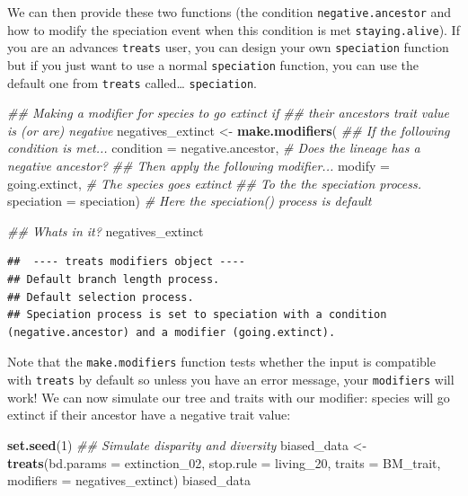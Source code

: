 \documentclass[
]{book}
\newenvironment{Shaded}{\begin{snugshade}}{\end{snugshade}}
\newcommand{\CommentTok}[1]{\textcolor[rgb]{0.56,0.35,0.01}{\textit{#1}}}
\newcommand{\DataTypeTok}[1]{\textcolor[rgb]{0.13,0.29,0.53}{#1}}
\newcommand{\DecValTok}[1]{\textcolor[rgb]{0.00,0.00,0.81}{#1}}
\newcommand{\KeywordTok}[1]{\textcolor[rgb]{0.13,0.29,0.53}{\textbf{#1}}}
\newcommand{\NormalTok}[1]{#1}
\newcommand{\StringTok}[1]{\textcolor[rgb]{0.31,0.60,0.02}{#1}}
\begin{document}
We can then provide these two functions (the condition \texttt{negative.ancestor} and how to modify the speciation event when this condition is met \texttt{staying.alive}).
If you are an advances \texttt{treats} user, you can design your own \texttt{speciation} function but if you just want to use a normal \texttt{speciation} function, you can use the default one from \texttt{treats} called\ldots{} \texttt{speciation}.

\begin{Shaded}
\begin{Highlighting}[]
\CommentTok{\#\# Making a modifier for species to go extinct if}
\CommentTok{\#\# their ancestor\textquotesingle{}s trait value is (or are) negative}
\NormalTok{negatives\_extinct \textless{}{-}}\StringTok{ }\KeywordTok{make.modifiers}\NormalTok{(}
            \CommentTok{\#\# If the following condition is met...}
            \DataTypeTok{condition =}\NormalTok{ negative.ancestor, }\CommentTok{\# Does the lineage has a negative ancestor?}
            \CommentTok{\#\# Then apply the following modifier...}
            \DataTypeTok{modify =}\NormalTok{ going.extinct, }\CommentTok{\# The species goes extinct}
            \CommentTok{\#\# To the the speciation process.}
            \DataTypeTok{speciation =}\NormalTok{ speciation) }\CommentTok{\# Here the speciation() process is default}

\CommentTok{\#\# What\textquotesingle{}s in it?}
\NormalTok{negatives\_extinct}
\end{Highlighting}
\end{Shaded}

\begin{verbatim}
##  ---- treats modifiers object ---- 
## Default branch length process.
## Default selection process.
## Speciation process is set to speciation with a condition (negative.ancestor) and a modifier (going.extinct).
\end{verbatim}

Note that the \texttt{make.modifiers} function tests whether the input is compatible with \texttt{treats} by default so unless you have an error message, your \texttt{modifiers} will work!
We can now simulate our tree and traits with our modifier: species will go extinct if their ancestor have a negative trait value:

\begin{Shaded}
\begin{Highlighting}[]
\KeywordTok{set.seed}\NormalTok{(}\DecValTok{1}\NormalTok{)}
\CommentTok{\#\# Simulate disparity and diversity}
\NormalTok{biased\_data \textless{}{-}}\StringTok{ }\KeywordTok{treats}\NormalTok{(}\DataTypeTok{bd.params =}\NormalTok{ extinction\_}\DecValTok{02}\NormalTok{,}
                    \DataTypeTok{stop.rule =}\NormalTok{ living\_}\DecValTok{20}\NormalTok{,}
                    \DataTypeTok{traits    =}\NormalTok{ BM\_trait,}
                    \DataTypeTok{modifiers =}\NormalTok{ negatives\_extinct)}
\NormalTok{biased\_data}
\end{Highlighting}
\end{Shaded}
\end{document}
